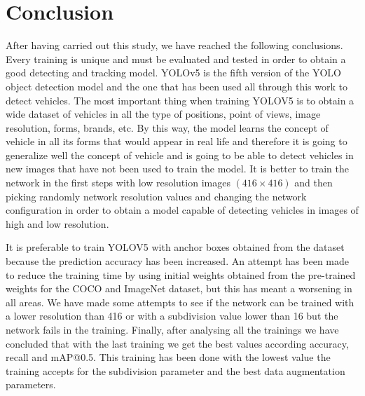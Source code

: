 \chapter[Conclusion]{Conclusion}

\regularsection
\headerregularsection

\begin{sloppypar} %
After having carried out this study, we have reached the following conclusions. Every training is 
unique  and  must  be  evaluated  and  tested  in  order  to  obtain  a  good  detecting  and  tracking 
model. YOLOv5 is the fifth version of the  YOLO object  detection model and the  one  that has 
been  used  all  through  this  work  to  detect  vehicles.  The  most  important  thing  when  training 
YOLOV5 is to obtain a wide dataset of vehicles in all the type of positions, point of views, image 
resolution, forms, brands, etc. By this way, the model learns the concept of vehicle in all its forms 
that would appear in real life and therefore it is going to generalize well the concept of vehicle 
and is going to be able to detect vehicles  in new  images  that  have not  been used to train the 
model. It is better to train the network in the first steps with low resolution images $(416 \times 416)$ 
and then picking randomly network resolution values and changing the network configuration 
in order to obtain a model capable of detecting vehicles in images of high and low resolution. 



It  is  preferable  to  train  YOLOV5  with  anchor  boxes  obtained  from  the  dataset  because  the 
prediction accuracy has been increased. An attempt has been made to reduce the training time 
by  using  initial  weights  obtained  from  the  pre-trained  weights  for  the  COCO  and  ImageNet 
dataset, but this has meant a worsening in all areas. We have made some attempts to see if the 
network can be trained with a lower resolution than 416 or with a subdivision value lower than 
16  but  the  network  fails  in  the  training.  Finally,  after  analysing  all  the  trainings  we  have 
concluded  that  with  the  last  training  we  get  the  best  values  according  accuracy,  recall  and 
mAP@0.5.  This  training  has  been  done  with  the  lowest  value  the  training  accepts  for  the 
subdivision parameter and the best data augmentation parameters. 




\end{sloppypar}
